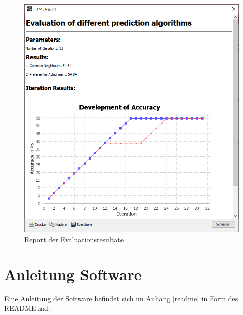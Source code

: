 \begin{figure}
    \centering
    \includegraphics[width=\linewidth]{resources/sc8.png}
    \caption{Report der Evaluationsresultate}
    \label{fig:screen10}
\end{figure}

\section{Anleitung Software}

Eine Anleitung der Software befindet sich im Anhang \ref{readme} in Form des README.md.
